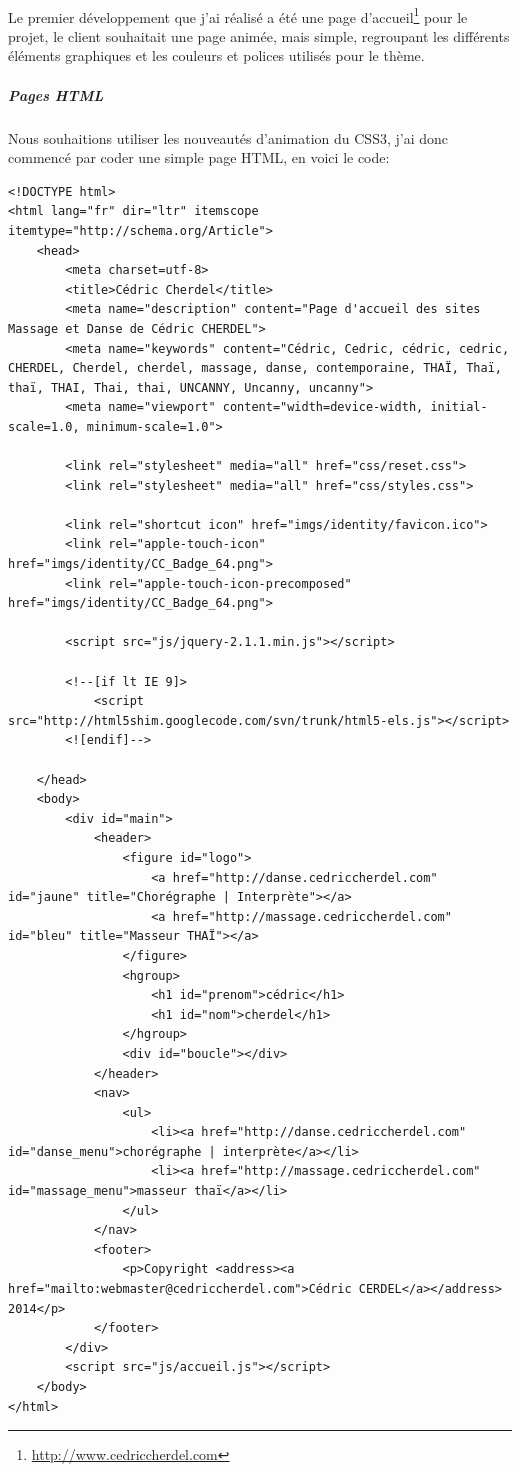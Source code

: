 \documentclass[11pt,a4paper,twoside]{report}
\begin{document}
			\paragraph*{}Le premier développement que j'ai réalisé a été une page d'accueil\footnote{\url{http://www.cedriccherdel.com}} pour le projet, le client souhaitait une page animée, mais simple, regroupant les différents éléments graphiques et les couleurs et polices utilisés pour le thème. 
				\subparagraph{Pages HTML}Nous souhaitions utiliser les nouveautés d'animation du CSS3, j'ai donc commencé par coder une simple page HTML, en voici le code:
					\begin{lstlisting}
<!DOCTYPE html>
<html lang="fr" dir="ltr" itemscope itemtype="http://schema.org/Article">
	<head>
		<meta charset=utf-8>
		<title>Cédric Cherdel</title>
        <meta name="description" content="Page d'accueil des sites Massage et Danse de Cédric CHERDEL">
        <meta name="keywords" content="Cédric, Cedric, cédric, cedric, CHERDEL, Cherdel, cherdel, massage, danse, contemporaine, THAÏ, Thaï, thaï, THAI, Thai, thai, UNCANNY, Uncanny, uncanny">
        <meta name="viewport" content="width=device-width, initial-scale=1.0, minimum-scale=1.0">
        
        <link rel="stylesheet" media="all" href="css/reset.css">
        <link rel="stylesheet" media="all" href="css/styles.css">

        <link rel="shortcut icon" href="imgs/identity/favicon.ico">
        <link rel="apple-touch-icon" href="imgs/identity/CC_Badge_64.png">
        <link rel="apple-touch-icon-precomposed" href="imgs/identity/CC_Badge_64.png">

        <script src="js/jquery-2.1.1.min.js"></script>

        <!--[if lt IE 9]>
            <script src="http://html5shim.googlecode.com/svn/trunk/html5-els.js"></script>
        <![endif]-->

    </head>
    <body>
		<div id="main">
	        <header>
				<figure id="logo">
					<a href="http://danse.cedriccherdel.com" id="jaune" title="Chorégraphe | Interprète"></a>
					<a href="http://massage.cedriccherdel.com" id="bleu" title="Masseur THAÏ"></a>
				</figure>
				<hgroup>
					<h1 id="prenom">cédric</h1>
					<h1 id="nom">cherdel</h1>
				</hgroup>
				<div id="boucle"></div>
    	    </header>
        	<nav>
		        <ul>
    		        <li><a href="http://danse.cedriccherdel.com" id="danse_menu">chorégraphe | interprète</a></li>
        	        <li><a href="http://massage.cedriccherdel.com" id="massage_menu">masseur thaï</a></li>
        	    </ul>
        	</nav>
			<footer>
				<p>Copyright <address><a href="mailto:webmaster@cedriccherdel.com">Cédric CERDEL</a></address> 2014</p>
			</footer>
		</div>
		<script src="js/accueil.js"></script>
    </body>
</html>					
					\end{lstlisting}
\end{document}
